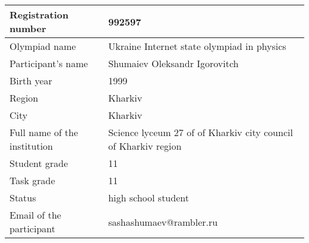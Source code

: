 \begin{tabular}{|p{7.5cm}|p{7.5cm}|}
\hline
Registration number & 992597\\
\hline
Olympiad name & Ukraine Internet state olympiad in physics\\
\hline
Participant's name & Shumaiev Oleksandr Igorovitch\\
\hline
Birth year & 1999\\
\hline
Region & Kharkiv\\
\hline
City & Kharkiv\\
\hline
Full name of the institution & Science lyceum 27 of of Kharkiv city council of Kharkiv region\\
\hline
Student grade & 11\\
\hline
Task grade & 11\\
\hline
Status & high school student\\
\hline
Email of the participant & sashashumaev@rambler.ru\\
\hline
\end{tabular}
\pagebreak